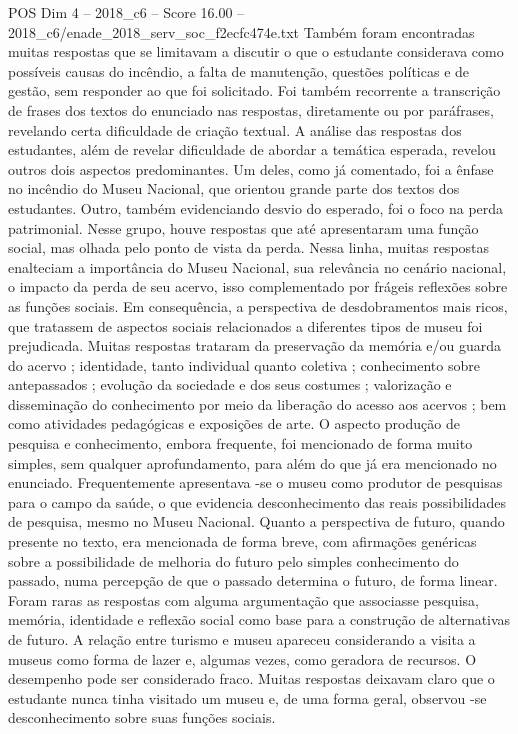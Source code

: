 \begin{textsample}{POS Dim 4 – 2018\_c6 – Score 16.00 – 2018\_c6/enade\_2018\_serv\_soc\_f2ecfc474e.txt}
Também foram encontradas muitas respostas que se limitavam a discutir o que o estudante considerava como possíveis causas do incêndio, a falta de manutenção, questões políticas e de gestão, sem responder ao que foi solicitado.
Foi também recorrente a transcrição de frases dos textos do enunciado nas respostas, diretamente ou por paráfrases, revelando certa dificuldade de criação textual.
A análise das respostas dos estudantes, além de revelar dificuldade de abordar a temática esperada, revelou outros dois aspectos predominantes.
Um deles, como já comentado, foi a ênfase no incêndio do Museu Nacional, que orientou grande parte dos textos dos estudantes.
Outro, também evidenciando desvio do esperado, foi o foco na perda patrimonial.
Nesse grupo, houve respostas que até apresentaram uma função social, mas olhada pelo ponto de vista da perda.
Nessa linha, muitas respostas enalteciam a importância do Museu Nacional, sua relevância no cenário nacional, o impacto da perda de seu acervo, isso complementado por frágeis reflexões sobre as funções sociais.
Em consequência, a perspectiva de desdobramentos mais ricos, que tratassem de aspectos sociais relacionados a diferentes tipos de museu foi prejudicada.
Muitas respostas trataram da preservação da memória e/ou guarda do acervo ; identidade, tanto individual quanto coletiva ; conhecimento sobre antepassados ; evolução da sociedade e dos seus costumes ; valorização e disseminação do conhecimento por meio da liberação do acesso aos acervos ; bem como atividades pedagógicas e exposições de arte.
O aspecto produção de pesquisa e conhecimento, embora frequente, foi mencionado de forma muito simples, sem qualquer aprofundamento, para além do que já era mencionado no enunciado.
Frequentemente apresentava -se o museu como produtor de pesquisas para o campo da saúde, o que evidencia desconhecimento das reais possibilidades de pesquisa, mesmo no Museu Nacional.
Quanto a perspectiva de futuro, quando presente no texto, era mencionada de forma breve, com afirmações genéricas sobre a possibilidade de melhoria do futuro pelo simples conhecimento do passado, numa percepção de que o passado determina o futuro, de forma linear.
Foram raras as respostas com alguma argumentação que associasse pesquisa, memória, identidade e reflexão social como base para a construção de alternativas de futuro.
A relação entre turismo e museu apareceu considerando a visita a museus como forma de lazer e, algumas vezes, como geradora de recursos.
O desempenho pode ser considerado fraco.
Muitas respostas deixavam claro que o estudante nunca tinha visitado um museu e, de uma forma geral, observou -se desconhecimento sobre suas funções sociais.

\end{textsample}
